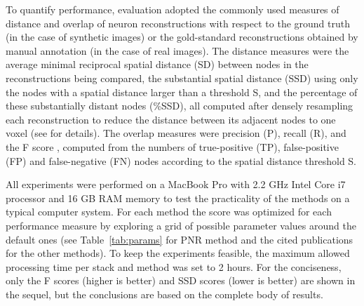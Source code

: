 To quantify performance, evaluation adopted the commonly used measures of distance and overlap of neuron reconstructions with respect to the ground truth (in the case of synthetic images) or the gold-standard reconstructions obtained by manual annotation (in the case of real images). The distance measures were the average minimal reciprocal spatial distance (SD) between nodes in the reconstructions being compared, the substantial spatial distance (SSD) using only the nodes with a spatial distance larger than a threshold S, and the percentage of these substantially distant nodes (\%SSD), all computed after densely resampling each reconstruction to reduce the distance between its adjacent nodes to one voxel (see \cite{peng2010v3d} for details). The overlap measures were precision (P), recall (R), and the F score \cite{powers2011evaluation}, computed from the numbers of true-positive (TP), false-positive (FP) and false-negative (FN) nodes according to the spatial distance threshold S.

All experiments were performed on a MacBook Pro with 2.2 GHz Intel Core i7 processor and 16 GB RAM memory to test the practicality of the methods on a typical computer system. For each method the score was optimized for each performance measure by exploring a grid of possible parameter values around the default ones (see Table~\ref{tab:params} for PNR method and the cited publications for the other methods). To keep the experiments feasible, the maximum allowed processing time per stack and method was set to 2 hours. For the conciseness, only the F scores (higher is better) and SSD scores (lower is better) are shown in the sequel, but the conclusions are based on the complete body of results.

